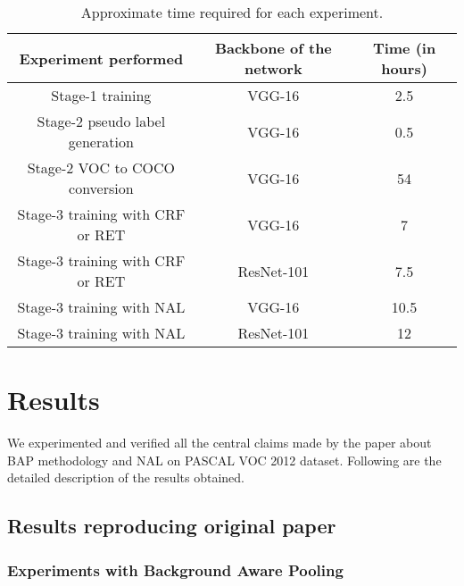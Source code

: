 \begin{table}[ht!]
\begin{center}
\begin{tabular}{ccc} \toprule\toprule
Experiment performed              & Backbone of the network     &Time (in hours)\\ \midrule
Stage-1 training                &VGG-16                         &2.5 \\ 
Stage-2 pseudo label generation                &VGG-16          &0.5 \\ 
Stage-2 VOC to COCO conversion    &VGG-16                       &54\\  
Stage-3 training with CRF or RET         &VGG-16                &7 \\ 
Stage-3 training with CRF or RET         &ResNet-101            &7.5 \\ 
Stage-3 training with NAL             &VGG-16                   &10.5  \\ 
Stage-3 training with NAL             &ResNet-101               &12  \\ \bottomrule
\end{tabular}
\vspace{1mm}
\caption{Approximate time required for each experiment.}
\label{tab:time}
\end{center}
\end{table}


\section{Results}
\label{sec:results}

We experimented and verified all the central claims made by the paper about BAP methodology and NAL on PASCAL VOC 2012 dataset. Following are the detailed description of the results obtained.

\subsection{Results reproducing original paper}

\subsubsection{Experiments with Background Aware Pooling}

